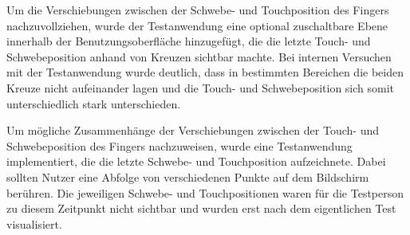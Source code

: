 \documentclass[12pt,bibliography=totocnumbered,listof=totocnumbered,abstracton]{scrreprt}
\begin{document}
Um die Verschiebungen zwischen der Schwebe- und Touchposition des Fingers nachzuvollziehen, wurde der Testanwendung eine optional zuschaltbare Ebene innerhalb der Benutzungsoberfläche hinzugefügt, die die letzte Touch- und Schwebeposition anhand von Kreuzen sichtbar machte. Bei internen Versuchen mit der Testanwendung wurde deutlich, dass in bestimmten Bereichen die beiden Kreuze nicht aufeinander lagen und die Touch- und Schwebeposition sich somit unterschiedlich stark unterschieden.

Um mögliche Zusammenhänge der Verschiebungen zwischen der Touch- und Schwebeposition des Fingers nachzuweisen, wurde eine Testanwendung implementiert, die die letzte Schwebe- und Touchposition aufzeichnete. Dabei sollten Nutzer eine Abfolge von verschiedenen Punkte auf dem Bildschirm berühren. Die jeweiligen Schwebe- und Touchpositionen waren für die Testperson zu diesem Zeitpunkt nicht sichtbar und wurden erst nach dem eigentlichen Test visualisiert.
\end{document}
